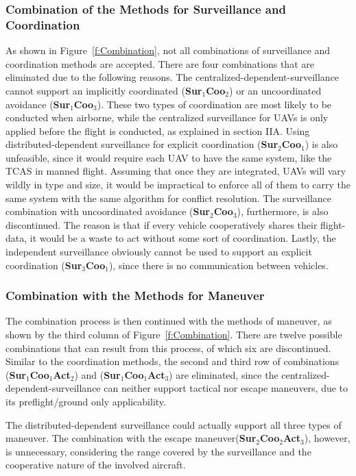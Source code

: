  \subsubsection{Combination of the Methods for Surveillance and Coordination}
As shown in Figure~\ref{f:Combination}, not all combinations of surveillance and coordination methods are accepted. There are four combinations that are eliminated due to the following reasons. The centralized-dependent-surveillance cannot support an implicitly coordinated (\textbf{Sur$_1$Coo$_2$}) or an uncoordinated avoidance (\textbf{Sur$_1$Coo$_3$}). These two types of coordination are most likely to be conducted when airborne, while the centralized surveillance for UAVs is only applied before the flight is conducted, as explained in section IIA. Using distributed-dependent surveillance for explicit coordination (\textbf{Sur$_2$Coo$_1$}) is also unfeasible, since it would require each UAV to have the same system, like the TCAS in manned flight. Assuming that once they are integrated, UAVs will vary wildly in type and size, it would be impractical to enforce all of them to carry the same system with the same algorithm for conflict resolution. The surveillance combination with uncoordinated avoidance (\textbf{Sur$_2$Coo$_3$}), furthermore, is also discontinued. The reason is that if every vehicle cooperatively shares their flight-data, it would be a waste to act without some sort of coordination. Lastly, the independent surveillance obviously cannot be used to support an explicit coordination (\textbf{Sur$_3$Coo$_1$}), since there is no communication between vehicles. 

 \subsubsection{Combination with the Methods for Maneuver}
The combination process is then continued with the methods of maneuver, as shown by the third column of Figure~\ref{f:Combination}. There are twelve possible combinations that can result from this process, of which six are discontinued. Similar to the coordination methods, the second and third row of combinations (\textbf{Sur$_1$Coo$_1$Act$_2$}) and (\textbf{Sur$_1$Coo$_1$Act$_3$}) are eliminated, since the centralized-dependent-surveillance can neither support tactical nor escape maneuvers, due to its preflight/ground only applicability. 

The distributed-dependent surveillance could actually support all three types of maneuver. The combination with the escape maneuver(\textbf{Sur$_2$Coo$_2$Act$_3$}), however, is unnecessary, considering the range covered by the surveillance and the cooperative nature of the involved aircraft. 

